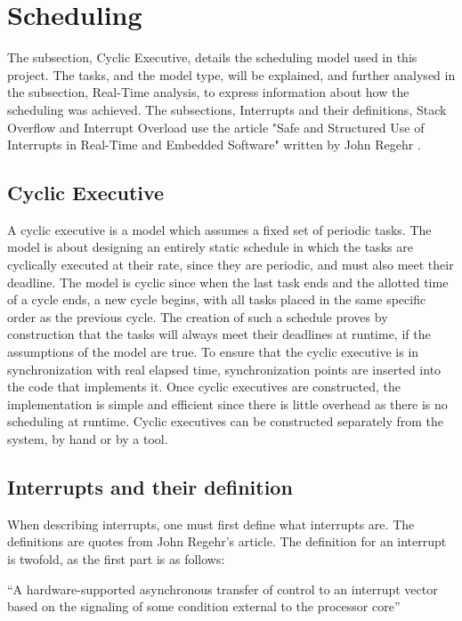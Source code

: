 \section{Scheduling}
\label{sec:Scheduling}
The subsection, Cyclic Executive, details the scheduling model used in this project. The tasks, and the model type, will be explained, and further analysed in the subsection, Real-Time analysis, to express information about how the scheduling was achieved.
The subsections, Interrupts and their definitions, Stack Overflow and Interrupt Overload use the article "Safe and Structured Use of Interrupts in Real-Time and
Embedded Software" written by John Regehr \citep{safe}.


\subsection{Cyclic Executive}
\label{sec:Cyclic Executive}
A cyclic executive is a model which assumes a fixed set of periodic tasks. The model is about designing an entirely static schedule in which the tasks are cyclically executed at their rate, since they are periodic, and must also meet their deadline. The model is cyclic since when the last task ends and the allotted time of a cycle ends, a new cycle begins, with all tasks placed in the same specific order as the previous cycle. The creation of such a schedule proves by construction that the tasks will always meet their deadlines at runtime, if the assumptions of the model are true. \newline
To ensure that the cyclic executive is in synchronization with real elapsed time, synchronization points are inserted into the code that implements it.
Once cyclic executives are constructed, the implementation is simple and efficient since there is little overhead as there is no scheduling at runtime. Cyclic executives can be constructed separately from the system, by hand or by a tool. \citep{rtsbog}


\subsection{Interrupts and their definition}
\label{sec:Interrupts and their definition}
When describing interrupts, one must first define what interrupts are. The definitions are quotes from John Regehr's article. The definition for an interrupt is twofold, as the first part is as follows:


{\addtolength{\leftskip}{10 mm}
	\enquote{A hardware-supported asynchronous transfer of control to an interrupt vector based on the signaling of some condition external to the processor core}
	
}


